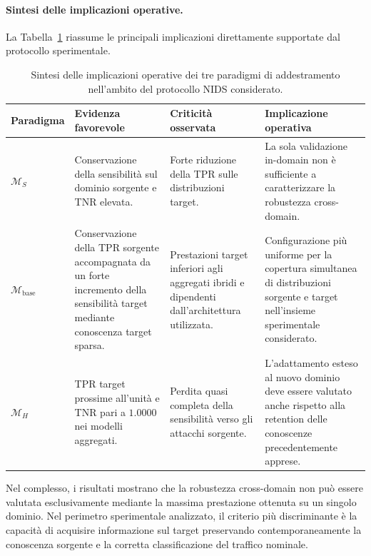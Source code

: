 \paragraph{Sintesi delle implicazioni operative.}
La Tabella~\ref{tab:cap5_operational_summary} riassume le principali implicazioni direttamente supportate dal protocollo sperimentale.

\begin{table}[H]
    \centering
    \caption{Sintesi delle implicazioni operative dei tre paradigmi di addestramento nell'ambito del protocollo NIDS considerato.}
    \label{tab:cap5_operational_summary}
    \footnotesize
    \begin{tabularx}{\textwidth}{l >{\raggedright\arraybackslash}X >{\raggedright\arraybackslash}X >{\raggedright\arraybackslash}X}
        \toprule
        \textbf{Paradigma} & \textbf{Evidenza favorevole} & \textbf{Criticità osservata} & \textbf{Implicazione operativa} \\
        \midrule
        $\mathcal{M}_{S}$
        & Conservazione della sensibilità sul dominio sorgente e TNR elevata.
        & Forte riduzione della TPR sulle distribuzioni target.
        & La sola validazione in-domain non è sufficiente a caratterizzare la robustezza cross-domain. \\
        \addlinespace
        $\mathcal{M}_{\mathrm{base}}$
        & Conservazione della TPR sorgente accompagnata da un forte incremento della sensibilità target mediante conoscenza target sparsa.
        & Prestazioni target inferiori agli aggregati ibridi e dipendenti dall'architettura utilizzata.
        & Configurazione più uniforme per la copertura simultanea di distribuzioni sorgente e target nell'insieme sperimentale considerato. \\
        \addlinespace
        $\mathcal{M}_{H}$
        & TPR target prossime all'unità e TNR pari a $1.0000$ nei modelli aggregati.
        & Perdita quasi completa della sensibilità verso gli attacchi sorgente.
        & L'adattamento esteso al nuovo dominio deve essere valutato anche rispetto alla retention delle conoscenze precedentemente apprese. \\
        \bottomrule
    \end{tabularx}
\end{table}

Nel complesso, i risultati mostrano che la robustezza cross-domain non può essere valutata esclusivamente mediante la massima prestazione ottenuta su un singolo dominio. 
Nel perimetro sperimentale analizzato, il criterio più discriminante è la capacità di acquisire informazione sul target preservando contemporaneamente la conoscenza sorgente e la corretta classificazione del traffico nominale.

